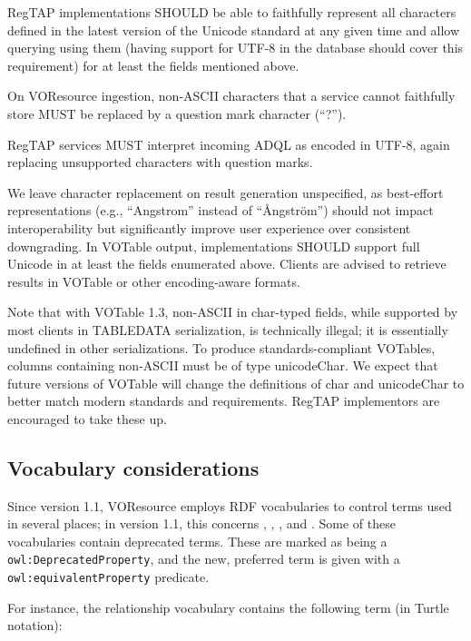 \documentclass[11pt,a4paper]{ivoa}
\begin{document}
RegTAP implementations SHOULD be able to faithfully represent all
characters defined in the latest version of the Unicode standard 
\citep{std:UNICODE} at
any given time and allow querying using them (having support for UTF-8
in the database should cover this requirement) for at least the fields
mentioned above.

On VOResource ingestion, non-ASCII characters that a service cannot
faithfully store MUST be replaced by a question mark character (``?'').

RegTAP services MUST interpret incoming ADQL as encoded in UTF-8,
again replacing unsupported characters with question marks.

We leave character replacement on result generation unspecified, as
best-effort representations (e.g., ``Angstrom'' instead of ``Ångström'')
should not impact interoperability but significantly improve user
experience over consistent downgrading.  In VOTable output,
implementations SHOULD support full Unicode in at least the fields
enumerated above.  Clients are advised to retrieve results in VOTable or
other encoding-aware formats.

Note that with VOTable 1.3, non-ASCII in char-typed fields, while
supported by most clients in TABLEDATA serialization, is technically
illegal; it is essentially undefined in other serializations.  To
produce standards-compliant VOTables, columns containing non-ASCII must
be of type unicodeChar.  We expect that future versions of VOTable will
change the definitions of char and unicodeChar to better match modern
standards and requirements.  RegTAP implementors are encouraged to take
these up.

\subsection{Vocabulary considerations}

\label{vocab-use}

Since version 1.1, VOResource employs RDF vocabularies to control terms
used in several places; in version 1.1, this concerns
, ,
, and .
Some of these vocabularies contain deprecated terms.  These are marked
as being a \texttt{owl:DeprecatedProperty}, and the new, preferred term
is given with a \texttt{owl:equivalentProperty} predicate.

For instance, the relationship vocabulary contains the following term
(in Turtle notation):
\end{document}
